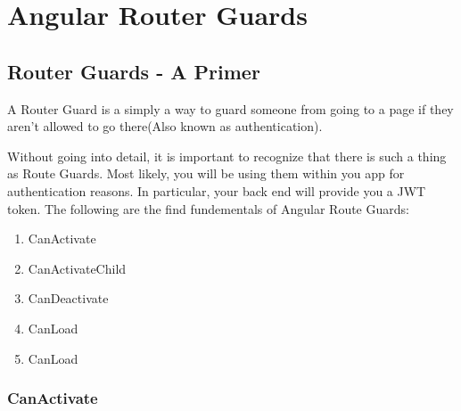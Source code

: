 \maketitle{}
\section{ Angular Router Guards }

\subsection{ Router Guards - A Primer }
A Router Guard is a simply a way to guard someone from going to a page if they
aren't allowed to go there(Also known as authentication).

Without going into detail, it is important to recognize that there is such a
thing as Route Guards. Most likely, you will be using them within you app
for authentication reasons. In particular, your back end will provide you a JWT
token. The following are the find fundementals of Angular Route Guards:
\begin{enumerate}
  \item CanActivate
  \item CanActivateChild
  \item CanDeactivate
  \item CanLoad
  \item CanLoad
\end{enumerate}

\subsubsection{ CanActivate }
